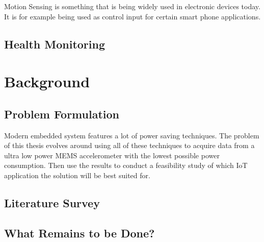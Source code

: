 Motion Sensing is something that is being widely used in electronic devices today. It is for example being used as control input for certain smart phone applications.

\subsection{Health Monitoring}


\section{Background}
\subsection*{Problem Formulation}

Modern embedded system features a lot of power saving techniques. The problem of this thesis evolves around using all of these techniques to acquire data from a ultra low power MEMS accelerometer with the lowest possible power consumption. Then use the results to conduct a feasibility study of which IoT application the solution will be best suited for.

\subsection*{Literature Survey}

\subsection*{What Remains to be Done?}
